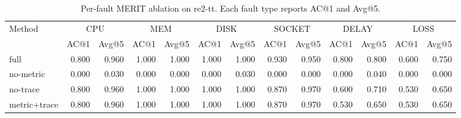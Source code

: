 \begin{table}[t]
\centering
\small
\caption{Per-fault MERIT ablation on re2-tt. Each fault type reports AC@1 and Avg@5.}
\label{tab:merit-ablation-re2tt-matrix}
\begin{tabular}{lrrrrrrrrrrrr}
\toprule
Method & \multicolumn{2}{c}{CPU} & \multicolumn{2}{c}{MEM} & \multicolumn{2}{c}{DISK} & \multicolumn{2}{c}{SOCKET} & \multicolumn{2}{c}{DELAY} & \multicolumn{2}{c}{LOSS} \\
\cmidrule(lr){2-3} \cmidrule(lr){4-5} \cmidrule(lr){6-7} \cmidrule(lr){8-9} \cmidrule(lr){10-11} \cmidrule(lr){12-13}
  & AC@1 & Avg@5 & AC@1 & Avg@5 & AC@1 & Avg@5 & AC@1 & Avg@5 & AC@1 & Avg@5 & AC@1 & Avg@5 \\
\midrule
full & 0.800 & 0.960 & 1.000 & 1.000 & 1.000 & 1.000 & 0.930 & 0.950 & 0.800 & 0.800 & 0.600 & 0.750 \\
no-metric & 0.000 & 0.030 & 0.000 & 0.000 & 0.000 & 0.030 & 0.000 & 0.000 & 0.000 & 0.040 & 0.000 & 0.000 \\
no-trace & 0.800 & 0.960 & 1.000 & 1.000 & 1.000 & 1.000 & 0.870 & 0.970 & 0.600 & 0.710 & 0.530 & 0.650 \\
metric+trace & 0.800 & 0.960 & 1.000 & 1.000 & 1.000 & 1.000 & 0.870 & 0.970 & 0.530 & 0.650 & 0.530 & 0.650 \\
\bottomrule
\end{tabular}
\end{table}
